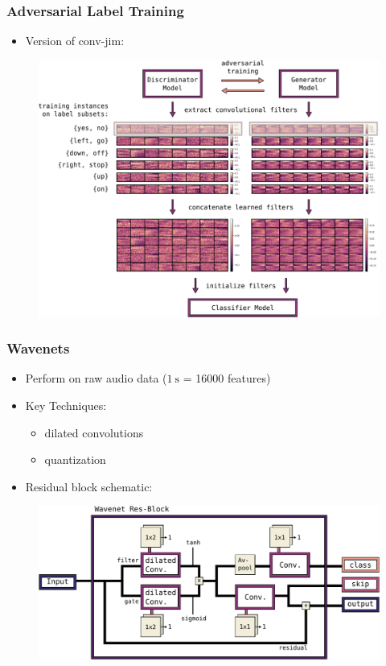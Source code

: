 \begin{frame}
  \frametitle{Adversarial Label Training}
  \begin{itemize}
    \item Version of conv-jim:
  \end{itemize}
  \begin{figure} \includegraphics[height=0.5\textheight]{../4_nn/figs/nn_adv_label_scheme.pdf} \end{figure}
\end{frame}


\begin{frame}
  \frametitle{Wavenets}
  \begin{itemize}
    \item Perform  on raw audio data ($\SI{1}{\second}$ = 16000 features)
    \item Key Techniques: 
    \begin{itemize}
      \item dilated convolutions
      \item quantization
    \end{itemize}
    \item Residual block schematic:
  \end{itemize}
  \begin{figure} \includegraphics[height=0.35\textheight]{../4_nn/figs/nn_arch_wavenet_block.pdf} \end{figure}
\end{frame}

